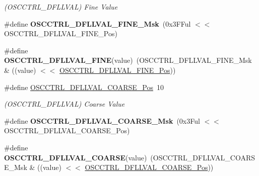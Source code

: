 \begin{DoxyCompactItemize}
\begin{DoxyCompactList}\small\item\em (O\+S\+C\+C\+T\+R\+L\+\_\+\+D\+F\+L\+L\+V\+A\+L) Fine Value \end{DoxyCompactList}\item 
\hypertarget{group___s_a_m_l21___o_s_c_c_t_r_l_ga2609665d0375395534f10e639d5ad6a7}{}\#define {\bfseries O\+S\+C\+C\+T\+R\+L\+\_\+\+D\+F\+L\+L\+V\+A\+L\+\_\+\+F\+I\+N\+E\+\_\+\+Msk}~(0x3\+F\+Ful $<$$<$ O\+S\+C\+C\+T\+R\+L\+\_\+\+D\+F\+L\+L\+V\+A\+L\+\_\+\+F\+I\+N\+E\+\_\+\+Pos)\label{group___s_a_m_l21___o_s_c_c_t_r_l_ga2609665d0375395534f10e639d5ad6a7}

\item 
\hypertarget{group___s_a_m_l21___o_s_c_c_t_r_l_ga01484ea77788e02e406ba345c3ada3a4}{}\#define {\bfseries O\+S\+C\+C\+T\+R\+L\+\_\+\+D\+F\+L\+L\+V\+A\+L\+\_\+\+F\+I\+N\+E}(value)~(O\+S\+C\+C\+T\+R\+L\+\_\+\+D\+F\+L\+L\+V\+A\+L\+\_\+\+F\+I\+N\+E\+\_\+\+Msk \& ((value) $<$$<$ \hyperlink{group___s_a_m_l21___o_s_c_c_t_r_l_gacbf24eb2695191929f7fe5384e93ac82}{O\+S\+C\+C\+T\+R\+L\+\_\+\+D\+F\+L\+L\+V\+A\+L\+\_\+\+F\+I\+N\+E\+\_\+\+Pos}))\label{group___s_a_m_l21___o_s_c_c_t_r_l_ga01484ea77788e02e406ba345c3ada3a4}

\item 
\hypertarget{group___s_a_m_l21___o_s_c_c_t_r_l_ga4060e9896f8ecee10e8c47b916b0a036}{}\#define \hyperlink{group___s_a_m_l21___o_s_c_c_t_r_l_ga4060e9896f8ecee10e8c47b916b0a036}{O\+S\+C\+C\+T\+R\+L\+\_\+\+D\+F\+L\+L\+V\+A\+L\+\_\+\+C\+O\+A\+R\+S\+E\+\_\+\+Pos}~10\label{group___s_a_m_l21___o_s_c_c_t_r_l_ga4060e9896f8ecee10e8c47b916b0a036}

\begin{DoxyCompactList}\small\item\em (O\+S\+C\+C\+T\+R\+L\+\_\+\+D\+F\+L\+L\+V\+A\+L) Coarse Value \end{DoxyCompactList}\item 
\hypertarget{group___s_a_m_l21___o_s_c_c_t_r_l_ga59942b1597ad6c55098431ea61bd4469}{}\#define {\bfseries O\+S\+C\+C\+T\+R\+L\+\_\+\+D\+F\+L\+L\+V\+A\+L\+\_\+\+C\+O\+A\+R\+S\+E\+\_\+\+Msk}~(0x3\+Ful $<$$<$ O\+S\+C\+C\+T\+R\+L\+\_\+\+D\+F\+L\+L\+V\+A\+L\+\_\+\+C\+O\+A\+R\+S\+E\+\_\+\+Pos)\label{group___s_a_m_l21___o_s_c_c_t_r_l_ga59942b1597ad6c55098431ea61bd4469}

\item 
\hypertarget{group___s_a_m_l21___o_s_c_c_t_r_l_gade38660b7d7de5b6444051e6a4234973}{}\#define {\bfseries O\+S\+C\+C\+T\+R\+L\+\_\+\+D\+F\+L\+L\+V\+A\+L\+\_\+\+C\+O\+A\+R\+S\+E}(value)~(O\+S\+C\+C\+T\+R\+L\+\_\+\+D\+F\+L\+L\+V\+A\+L\+\_\+\+C\+O\+A\+R\+S\+E\+\_\+\+Msk \& ((value) $<$$<$ \hyperlink{group___s_a_m_l21___o_s_c_c_t_r_l_ga4060e9896f8ecee10e8c47b916b0a036}{O\+S\+C\+C\+T\+R\+L\+\_\+\+D\+F\+L\+L\+V\+A\+L\+\_\+\+C\+O\+A\+R\+S\+E\+\_\+\+Pos}))\label{group___s_a_m_l21___o_s_c_c_t_r_l_gade38660b7d7de5b6444051e6a4234973}


\end{DoxyCompactItemize}

